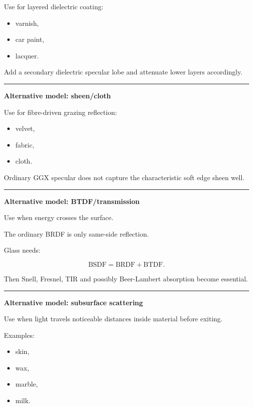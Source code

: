 Use for layered dielectric coating:

\begin{itemize}
\tightlist
\item
  varnish,
\item
  car paint,
\item
  lacquer.
\end{itemize}

Add a secondary dielectric specular lobe and attenuate lower layers accordingly.

\begin{center}\rule{0.5\linewidth}{0.5pt}\end{center}

\textbf{Alternative model: sheen/cloth}

Use for fibre-driven grazing reflection:

\begin{itemize}
\tightlist
\item
  velvet,
\item
  fabric,
\item
  cloth.
\end{itemize}

Ordinary GGX specular does not capture the characteristic soft edge sheen well.

\begin{center}\rule{0.5\linewidth}{0.5pt}\end{center}

\textbf{Alternative model: BTDF/transmission}

Use when energy crosses the surface.

The ordinary BRDF is only same-side reflection.

Glass needs:

\[
\text{BSDF}
=
\text{BRDF}
+
\text{BTDF}.
\]

Then Snell, Fresnel, TIR and possibly Beer-Lambert absorption become essential.

\begin{center}\rule{0.5\linewidth}{0.5pt}\end{center}

\textbf{Alternative model: subsurface scattering}

Use when light travels noticeable distances inside material before exiting.

Examples:

\begin{itemize}
\tightlist
\item
  skin,
\item
  wax,
\item
  marble,
\item
  milk.
\end{itemize}

